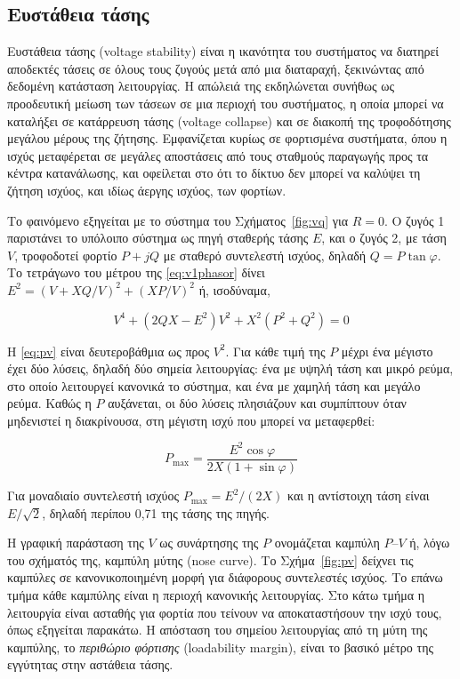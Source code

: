 \subsection{Ευστάθεια τάσης}
\label{sec:v-stability}

Ευστάθεια τάσης (voltage stability) είναι η ικανότητα του συστήματος να διατηρεί αποδεκτές
τάσεις σε όλους τους ζυγούς μετά από μια διαταραχή, ξεκινώντας από δεδομένη κατάσταση
λειτουργίας. Η απώλειά της εκδηλώνεται συνήθως ως προοδευτική μείωση των τάσεων σε μια περιοχή
του συστήματος, η οποία μπορεί να καταλήξει σε κατάρρευση τάσης (voltage collapse) και σε
διακοπή της τροφοδότησης μεγάλου μέρους της ζήτησης. Εμφανίζεται κυρίως σε φορτισμένα
συστήματα, όπου η ισχύς μεταφέρεται σε μεγάλες αποστάσεις από τους σταθμούς παραγωγής προς τα
κέντρα κατανάλωσης, και οφείλεται στο ότι το δίκτυο δεν μπορεί να καλύψει τη ζήτηση ισχύος, και
ιδίως άεργης ισχύος, των φορτίων.

Το φαινόμενο εξηγείται με το σύστημα του Σχήματος~\ref{fig:vq} για $R = 0$. Ο ζυγός 1
παριστάνει το υπόλοιπο σύστημα ως πηγή σταθερής τάσης $E$, και ο ζυγός 2, με τάση $V$,
τροφοδοτεί φορτίο $P + jQ$ με σταθερό συντελεστή ισχύος, δηλαδή $Q = P\tan\varphi$. Το
τετράγωνο του μέτρου της \eqref{eq:v1phasor} δίνει $E^2 = (V + XQ/V)^2 + (XP/V)^2$ ή,
ισοδύναμα,

\begin{equation}
V^4 + \left(2QX - E^2\right) V^2 + X^2\left(P^2 + Q^2\right) = 0
\label{eq:pv}
\end{equation}

Η \eqref{eq:pv} είναι δευτεροβάθμια ως προς $V^2$. Για κάθε τιμή της $P$ μέχρι ένα μέγιστο
έχει δύο λύσεις, δηλαδή δύο σημεία λειτουργίας: ένα με υψηλή τάση και μικρό ρεύμα, στο οποίο
λειτουργεί κανονικά το σύστημα, και ένα με χαμηλή τάση και μεγάλο ρεύμα. Καθώς η $P$ αυξάνεται,
οι δύο λύσεις πλησιάζουν και συμπίπτουν όταν μηδενιστεί η διακρίνουσα, στη μέγιστη ισχύ που
μπορεί να μεταφερθεί:

\begin{equation}
P_{\max} = \frac{E^2 \cos\varphi}{2X\left(1 + \sin\varphi\right)}
\label{eq:pmax}
\end{equation}

Για μοναδιαίο συντελεστή ισχύος $P_{\max} = E^2/(2X)$ και η αντίστοιχη τάση είναι
$E/\sqrt{2}$, δηλαδή περίπου 0,71 της τάσης της πηγής.

Η γραφική παράσταση της $V$ ως συνάρτησης της $P$ ονομάζεται καμπύλη $P$--$V$ ή, λόγω του
σχήματός της, καμπύλη μύτης (nose curve). Το Σχήμα~\ref{fig:pv} δείχνει τις καμπύλες σε
κανονικοποιημένη μορφή για διάφορους συντελεστές ισχύος. Το επάνω τμήμα κάθε καμπύλης είναι η
περιοχή κανονικής λειτουργίας. Στο κάτω τμήμα η λειτουργία είναι ασταθής για φορτία που τείνουν
να αποκαταστήσουν την ισχύ τους, όπως εξηγείται παρακάτω. Η απόσταση του σημείου λειτουργίας
από τη μύτη της καμπύλης, το \emph{περιθώριο φόρτισης} (loadability margin), είναι το βασικό
μέτρο της εγγύτητας στην αστάθεια τάσης.

